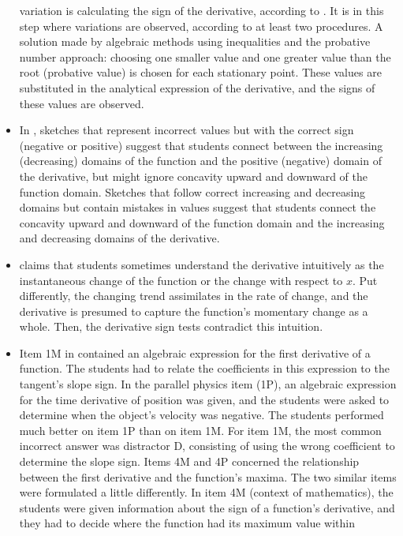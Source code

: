 \documentclass[11pt]{book}
\begin{document}
\begin{itemize}
variation is calculating the sign of the derivative, according to
\cite{cabanas2019didactic}.
It is in this step where variations are observed, according to at
least two procedures. A solution made by algebraic methods using inequalities
and the \textquotedbl probative number\textquotedbl{} approach: choosing
one smaller value and one greater value than the root (probative value)
is chosen for each stationary point. These values are substituted
in the analytical expression of the derivative, and the signs of these
values are observed.
\item In \cite{nagari14constrained},
sketches that represent incorrect values but with the correct sign
(negative or positive) suggest that students connect between the increasing
(decreasing) domains of the function and the positive (negative) domain
of the derivative, but might ignore concavity upward and downward
of the function domain. Sketches that follow correct increasing and
decreasing domains but contain mistakes in values suggest that students
connect the concavity upward and downward of the function domain and
the increasing and decreasing domains of the derivative.
\item \cite{kartal2019mathematical}
claims that students sometimes understand the derivative intuitively
as the \textquotedbl instantaneous change\textquotedbl{} of the function
or \textquotedbl the change with respect to $x$.\textquotedbl{}
Put differently, the changing trend assimilates in the rate of change,
and the derivative is presumed to capture the function's momentary
change as a whole. Then, the derivative sign tests contradict this
intuition.
\item Item 1M in \cite{carli2020testing}
contained an algebraic expression for the first derivative of a function.
The students had to relate the coefficients in this expression to
the tangent's slope sign. In the parallel physics item (1P), an algebraic
expression for the time derivative of position was given, and the
students were asked to determine when the object's velocity was negative.
The students performed much better on item 1P than on item 1M. For
item 1M, the most common incorrect answer was distractor D, consisting
of using the wrong coefficient to determine the slope sign. Items
4M and 4P concerned the relationship between the first derivative
and the function's maxima. The two similar items were formulated a
little differently. In item 4M (context of mathematics), the students
were given information about the sign of a function's derivative,
and they had to decide where the function had its maximum value within

\end{itemize}
\end{document}
